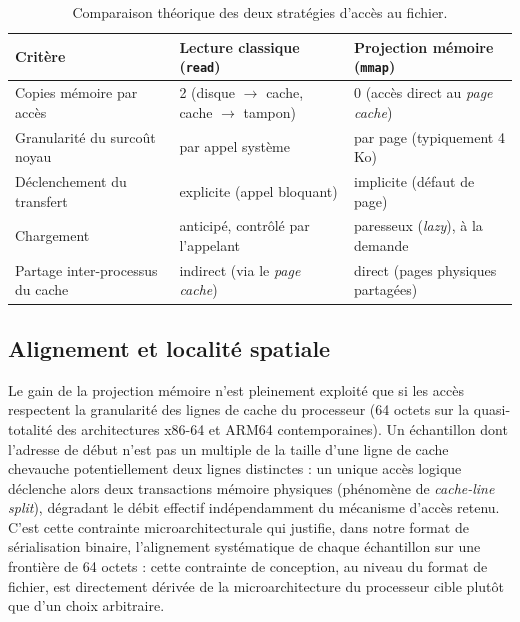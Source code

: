 \documentclass[12pt,a4paper]{report}
\begin{document}
\begin{table}[htbp]
  \centering
  \renewcommand{\arraystretch}{1.5}
  \begin{tabular}{|p{4.5cm}|p{5cm}|p{5cm}|}
    \hline
    \textbf{Critère} & \textbf{Lecture classique (\texttt{read})} & \textbf{Projection mémoire (\texttt{mmap})} \\
    \hline
    Copies mémoire par accès & 2 (disque $\rightarrow$ cache, cache $\rightarrow$ tampon) & 0 (accès direct au \textit{page cache}) \\
    \hline
    Granularité du surcoût noyau & par appel système & par page (typiquement 4 Ko) \\
    \hline
    Déclenchement du transfert & explicite (appel bloquant) & implicite (défaut de page) \\
    \hline
    Chargement & anticipé, contrôlé par l'appelant & paresseux (\textit{lazy}), à la demande \\
    \hline
    Partage inter-processus du cache & indirect (via le \textit{page cache}) & direct (pages physiques partagées) \\
    \hline
  \end{tabular}
  \vspace{0.2cm}
  \caption{Comparaison théorique des deux stratégies d'accès au fichier.}
  \label{tab:read_vs_mmap}
\end{table}

\subsection{Alignement et localité spatiale}

Le gain de la projection mémoire n'est pleinement exploité que si les accès respectent la granularité des lignes de cache du processeur (64 octets sur la quasi-totalité des architectures x86-64 et ARM64 contemporaines). Un échantillon dont l'adresse de début n'est pas un multiple de la taille d'une ligne de cache chevauche potentiellement deux lignes distinctes : un unique accès logique déclenche alors deux transactions mémoire physiques (phénomène de \textit{cache-line split}), dégradant le débit effectif indépendamment du mécanisme d'accès retenu. C'est cette contrainte microarchitecturale qui justifie, dans notre format de sérialisation binaire, l'alignement systématique de chaque échantillon sur une frontière de 64 octets : cette contrainte de conception, au niveau du format de fichier, est directement dérivée de la microarchitecture du processeur cible plutôt que d'un choix arbitraire.
\end{document}
